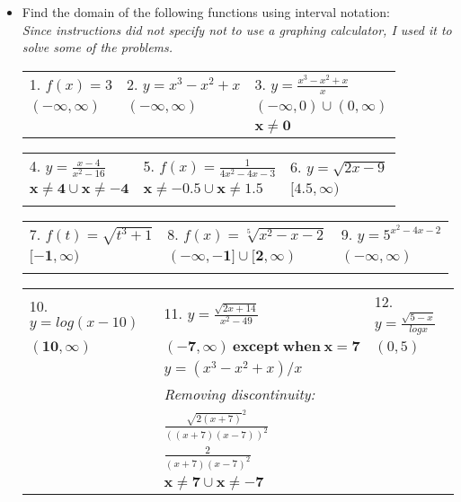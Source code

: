 \documentclass[a4paper]{article}
\begin{document}
   \begin{itemize} \itemsep 3em

   \item Find the domain of the following functions using interval notation: \\
   {\it Since instructions did not specify not to use a graphing calculator, I used it to solve some of the problems. }
   
   \begin{tabular}{ p{5cm} p{5cm} p{5cm} }
      1. $ f(x) = 3                        $&
      2. $ y = x^3 - x^2 + x               $&
      3. $ y = \frac{ x^3 - x^2 + x }{ x } $
   \\ 
      $ \bm{ (-\infty ,  \infty) }         $&
      $ \bm{ (-\infty, \infty) }           $&
      $ (-\infty, 0) \cup (0, \infty)      $
   \\
      & %
      & %
      $ \bm{ x \neq 0 } $
   \end{tabular}

   \begin{tabular}{ p{5cm} p{5cm} p{5cm} }
      4. $ y = \frac{ x-4 }{ x^2-16 }      $&
      5. $ f(x) = \frac{ 1 }{ 4x^2-4x-3 }  $&
      6. $ y = \sqrt{ 2x-9 }               $
   \\
      $ \bm{ x \neq 4 \cup x \neq -4 }     $&
      $ \bm{ x \neq -0.5 \cup x \neq 1.5 } $&
      $ \bm{ [4.5, \infty) }               $
   \\ \\ %
   \end{tabular}

   \begin{tabular}{ p{5cm} p{5cm} p{5cm} }
      7. $ f(t) = \sqrt{ t^3 + 1 }         $&
      8. $ f(x) = \sqrt[5]{ x^2 - x - 2 }  $&
      9. $ y = 5^{ x^2 - 4x - 2 }          $
   \\
      $ \bm{ [-1, \infty) }                $&
      $ \bm{ (-\infty,-1] \cup [2,\infty) }$&
      $ \bm{ (-\infty, \infty) }           $
   \\ \\ %
   \end{tabular}

   \begin{tabular}{ p{5cm} p{5cm} p{5cm} }
      10. $ y = log(x-10)                          $&
      11. $ y = \frac{ \sqrt{2x+14} }{ x^2-49 }    $&
      12. $ y = \frac{ \sqrt{5-x} }{ log x }       $
   \\
      $ \bm{ (10, \infty) }                        $&
      $ \bm{ (-7, \infty)\:except\:when\:x = 7 }   $&
      $ (0, 5)                                     $
   \\
      & %
      $ y = (x^3-x^2+x)/x $
   \\
      & %
      {\it Removing discontinuity: }
   \\
      & %
      $ \frac{ \sqrt{2(x+7)}^2 }{ ((x+7)(x-7))^2 } $
   \\
      & %
      $ \frac{ 2 }{ (x+7)(x-7)^2 }                 $
   \\
      & %
      $ \bm{ x \neq 7 \cup x \neq -7 }             $
   \end{tabular}

   \end{itemize}
\end{document}
